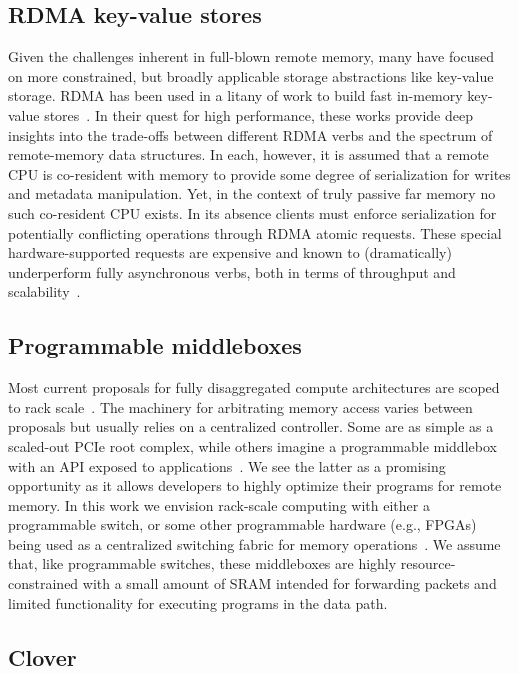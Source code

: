 \subsection{RDMA key-value stores}

Given the challenges inherent in full-blown remote memory, many have
focused on more constrained, but broadly applicable storage
abstractions like key-value storage.  RDMA has been used in a litany
of work to build fast in-memory key-value
stores~\cite{farm,MemC3,herd,pilaf,sonuma,storm}. In their quest for
high performance, these works provide deep insights into the
trade-offs between different RDMA verbs and the spectrum of
remote-memory data structures. In each, however, it is assumed that a
remote CPU is co-resident with memory to provide some degree of
serialization for writes and metadata manipulation. Yet, in the context of
truly passive far memory no such co-resident CPU exists.  In
its absence clients must enforce serialization for potentially
conflicting operations through RDMA atomic requests. These special
hardware-supported requests are expensive and known to (dramatically)
underperform fully asynchronous verbs, both in terms of throughput and
scalability~\cite{design-guidelines}.

\subsection{Programmable middleboxes}

Most current proposals for fully disaggregated compute architectures
are scoped to rack
scale~\cite{disandapp,the-machine,intel-rack,firebox}.  The machinery
for arbitrating memory access varies between proposals but usually
relies on a centralized controller.  Some are as simple as a
scaled-out PCIe root complex, while others imagine a programmable
middlebox with an API exposed to applications~\cite{disandapp}. We
see the latter as a promising opportunity as it allows developers to
highly optimize their programs for remote memory.  In this work we
envision rack-scale computing with either a programmable switch, or
some other programmable hardware (e.g., FPGAs) being used as a
centralized switching fabric for memory operations~\cite{supernic}. We
assume that, like programmable switches, these middleboxes are highly
resource-constrained with a small amount of SRAM intended for
forwarding packets and limited functionality for executing programs in
the data path.

\subsection{Clover}


